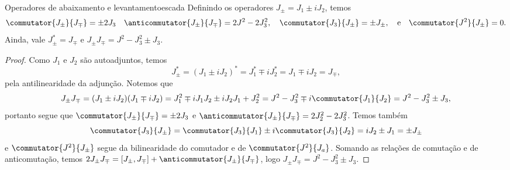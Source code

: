 \begin{lemma}{Operadores de abaixamento e levantamento}{escada}
    Definindo os operadores \(J_\pm = J_1 \pm i J_2\), temos
    \begin{equation*}
        \commutator{J_\pm}{J_\mp} = \pm 2J_3\quad
        \anticommutator{J_\pm}{J_\mp} = 2J^2 - 2J_3^2,\quad
        \commutator{J_3}{J_\pm} = \pm J_\pm,\quad\text{e}\quad
        \commutator{J^2}{J_\pm} = 0.
    \end{equation*}
    Ainda, vale \(J_\pm^* = J_\mp\) e \(J_\pm J_\mp = J^2 - J_3^2 \pm J_3\).
\end{lemma}
\begin{proof}
    Como \(J_1\) e \(J_2\) são autoadjuntos, temos
    \begin{equation*}
        J_\pm^* = (J_1 \pm i J_2)^* = J_1^* \mp i J_2^* = J_1 \mp i J_2 = J_{\mp},
    \end{equation*}
    pela antilinearidade da adjunção. Notemos que
    \begin{equation*}
        J_\pm J_\mp = (J_1 \pm i J_2)(J_1 \mp i J_2) = J_1^2 \mp i J_1 J_2 \pm i J_2 J_1 + J_2^2 = J^2 - J_3^2 \mp i \commutator{J_1}{J_2} = J^2 - J_3^2 \pm J_3,
    \end{equation*}
    portanto segue que \(\commutator{J_\pm}{J_\mp} = \pm2 J_3\) e \(\anticommutator{J_\pm}{J_\mp} = 2J_2^2 - 2J_3^2\). Temos também
    \begin{equation*}
        \commutator{J_3}{J_\pm} = \commutator{J_3}{J_1} \pm i \commutator{J_3}{J_2} = i J_2 \pm J_1 = \pm J_\pm
    \end{equation*}
    e \(\commutator{J^2}{J_\pm}\) segue da bilinearidade do comutador e de \(\commutator{J^2}{J_a}\). Somando as relações de comutação e de anticomutação, temos \(2J_\pm J_\mp = [J_\pm, J_\mp] + \anticommutator{J_\pm}{J_\mp}\), logo \(J_\pm J_\mp = J^2 - J_3^2 \pm J_3\).
\end{proof}


